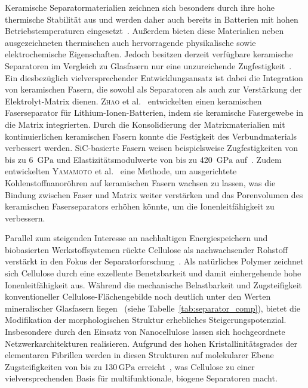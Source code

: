 Keramische Separatormaterialien zeichnen sich besonders durch ihre hohe thermische Stabilität aus und werden daher auch bereits in Batterien mit hohen Betriebstemperaturen eingesetzt~\cite{Qin2017,Cheong2012}. Außerdem bieten diese Materialien neben ausgezeichneten thermischen auch hervorragende physikalische sowie elektrochemische Eigenschaften. Jedoch besitzen derzeit verfügbare keramische Separatoren im Vergleich zu Glasfasern nur eine unzureichende Zugfestigkeit~\cite{Qin2017}. Ein diesbezüglich vielversprechender Entwicklungsansatz ist dabei die Integration von keramischen Fasern, die sowohl als Separatoren als auch zur Verstärkung der Elektrolyt-Matrix dienen. \textsc{Zhao} et al.~\cite{Zhao2017} entwickelten einen keramischen Faserseparator für Lithium-Ionen-Batterien, indem sie keramische Fasergewebe in die Matrix integrierten. Durch die Konsolidierung der Matrixmaterialien mit kontinuierlichen keramischen Fasern konnte die Festigkeit des Verbundmaterials verbessert werden. SiC-basierte Fasern weisen beispielsweise Zugfestigkeiten von bis zu 6~$\si{\GPa}$ und Elastizitätsmodulwerte von bis zu 420~$\si{\GPa}$ auf~\cite{Seydibeyoglu2017}. Zudem entwickelten \textsc{Yamamoto} et al.~\cite{Yamamoto2009} eine Methode, um ausgerichtete Kohlenstoffnanoröhren auf keramischen Fasern wachsen zu lassen, was die Bindung zwischen Faser und Matrix weiter verstärken und das Porenvolumen des keramischen Faserseparators erhöhen könnte, um die Ionenleitfähigkeit zu verbessern.

Parallel zum steigenden Interesse an nachhaltigen Energiespeichern und biobasierten Werkstoffsystemen rückte Cellulose als nachwachsender Rohstoff verstärkt in den Fokus der Separatorforschung~\cite{Liang2018, Teng2020}. Als natürliches Polymer zeichnet sich Cellulose durch eine exzellente Benetzbarkeit und damit einhergehende hohe Ionenleitfähigkeit aus. Während die mechanische Belastbarkeit und Zugsteifigkeit konventioneller Cellulose-Flächengebilde noch deutlich unter den Werten mineralischer Glasfasern liegen~\cite{Xu2020} (siehe Tabelle~\ref{tab:separator_comp}), bietet die Modifikation der morphologischen Struktur erhebliches Steigerungspotenzial.
Insbesondere durch den Einsatz von Nanocellulose lassen sich hochgeordnete Netzwerkarchitekturen realisieren. Aufgrund des hohen Kristallinitätsgrades der elementaren Fibrillen werden in diesen Strukturen auf molekularer Ebene Zugsteifigkeiten von bis zu 130\,$\si{\GPa}$ erreicht~\cite{Dufresne2013, Zhang2019}, was Cellulose zu einer vielversprechenden Basis für multifunktionale, biogene Separatoren macht.

